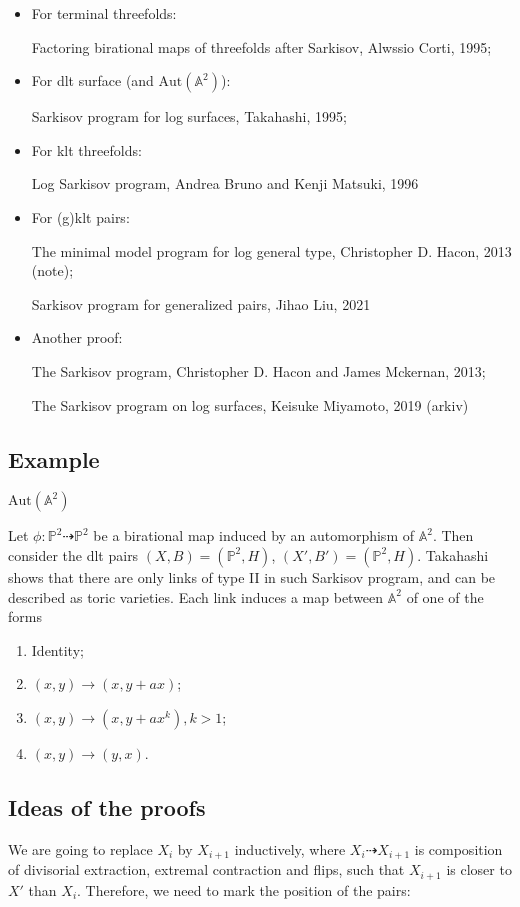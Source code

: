 \documentclass{article}
\begin{document}
	\begin{itemize}
		\item For terminal threefolds:
		
		Factoring birational maps of threefolds after Sarkisov, Alwssio Corti, 1995;
		\item For dlt surface (and $ \mathrm{Aut}(\mathbb{A}^2) $):
		
		 Sarkisov program for log surfaces, Takahashi, 1995;
		\item For klt threefolds:
		
		Log Sarkisov program, Andrea Bruno and Kenji Matsuki, 1996
		\item For (g)klt pairs:
		
		The minimal model program for log general type, Christopher D. Hacon, 2013 (note);
		
		Sarkisov program for generalized pairs, Jihao Liu, 2021
		\item Another proof:
		
		The Sarkisov program, Christopher D. Hacon and James Mckernan, 2013;
		
		The Sarkisov program on log surfaces, Keisuke Miyamoto, 2019 (arkiv)
	\end{itemize}
\subsection{Example} 
 $ \mathrm{Aut} (\mathbb{A}^2) $

Let $ \phi: \mathbb{P}^2\dashrightarrow\mathbb{P}^2 $ be a birational map induced by an automorphism of $ \mathbb{A}^2 $. Then consider the dlt pairs $ (X,B)=(\mathbb{P}^2,H) $, $ (X',B')=(\mathbb{P}^2,H) $. Takahashi shows that there are only links of type II in such Sarkisov program, and can be described as toric varieties. Each link induces a map between $ \mathbb{A}^2 $ of one of the forms
\begin{enumerate}
	\item Identity;
	\item $ (x,y)\to (x,y+ax) $;
	\item $ (x,y)\to (x,y+ax^k), k>1 $;
	\item $ (x,y)\to (y,x) $.
\end{enumerate}
\subsection{Ideas of the proofs}
We are going to replace $ X_i $ by $ X_{i+1} $ inductively, where $ X_i\dashrightarrow X_{i+1} $ is composition of divisorial extraction, extremal contraction and flips, such that $ X_{i+1} $ is closer to $ X' $ than $ X_i $. Therefore, we need to mark the position of the pairs:
\end{document}

